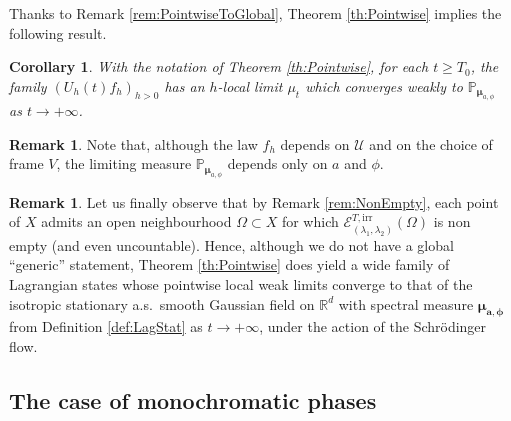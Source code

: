 \documentclass[JEP,XML,SOM,Unicode,published]{cedram}
\let\mathcal\mathscr
\newcommand{\irr}{\mathrm{irr}}
\theoremstyle{plain}
\newtheorem{corollary}[theorem]{Corollary}
\theoremstyle{definition}
\newtheorem{remark}[theorem]{Remark}
\newcommand{\R}{\mathbb{R}}
\def\calE{\mathcal{E}}
\def\calU{\mathcal{U}}
\begin{document}
Thanks to Remark \ref{rem:PointwiseToGlobal}, Theorem \ref{th:Pointwise} implies the following result.

\begin{corollary}
With the notation of Theorem \ref{th:Pointwise}, for each $t\geq T_0$, the family $\left(U_h(t) f_h\right)_{h>0}$ has an $h$-local limit $\mu_t$ which converges weakly to $\mathbb{P}_{\boldsymbol{\mu}_{a, \phi}}$ as $t\to+\infty$.
\end{corollary}

\begin{remark}
Note that, although the law $f_h$ depends on $\calU$ and on the choice of frame $V$, the limiting measure $\mathbb{P}_{\boldsymbol{\mu}_{a, \phi}}$ depends only on $a$ and $\phi$.
\end{remark}

\begin{remark}
Let us finally observe that by Remark \ref{rem:NonEmpty}, each point of $X$ admits an open neighbourhood $\Omega\subset X$ for which $\calE^{T,\irr}_{(\lambda_1,\lambda_2)}(\Omega)$ is non empty (and even uncountable). Hence, although we do not have a global ``generic'' statement, Theorem \ref{th:Pointwise} does yield a wide family of Lagrangian states whose pointwise local weak limits converge to that of the isotropic stationary a.s.\ smooth Gaussian field on $\R^d$ with spectral measure $\boldsymbol{\mu_{a,\phi}}$ from Definition \ref{def:LagStat} as $t\to+\infty$, under the action of the Schrödinger flow.
\end{remark}

\subsection{The case of monochromatic phases}\label{sec:IntroMono}
\end{document}
